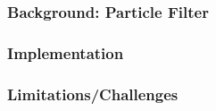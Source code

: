 \documentclass[12pt]{article}
\begin{document}
\subsubsection{Background: Particle Filter}

\subsubsection{Implementation}

\subsubsection{Limitations/Challenges}


\end{document}
